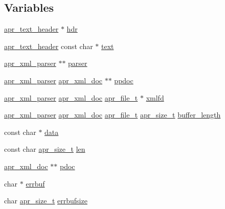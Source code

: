 \subsection*{Variables}
\begin{DoxyCompactItemize}
\item 
\hyperlink{structapr__text__header}{apr\+\_\+text\+\_\+header} $\ast$ \hyperlink{group__APR__Util__XML_gacbb04b51077cdb37e6a8cfa4c93acb07}{hdr}
\item 
\hyperlink{structapr__text__header}{apr\+\_\+text\+\_\+header} const char $\ast$ \hyperlink{group__APR__Util__XML_ga6f353ddc97cf6dc93417f58016afe82c}{text}
\item 
\hyperlink{structapr__xml__parser}{apr\+\_\+xml\+\_\+parser} $\ast$$\ast$ \hyperlink{group__APR__Util__XML_ga770a26ab91fad38f2253d5450d6e600e}{parser}
\item 
\hyperlink{structapr__xml__parser}{apr\+\_\+xml\+\_\+parser} \hyperlink{structapr__xml__doc}{apr\+\_\+xml\+\_\+doc} $\ast$$\ast$ \hyperlink{group__APR__Util__XML_ga66438ff2319899893737db49b7292842}{ppdoc}
\item 
\hyperlink{structapr__xml__parser}{apr\+\_\+xml\+\_\+parser} \hyperlink{structapr__xml__doc}{apr\+\_\+xml\+\_\+doc} \hyperlink{structapr__file__t}{apr\+\_\+file\+\_\+t} $\ast$ \hyperlink{group__APR__Util__XML_gaca3c8f1a059f6838f226f0c4879c0782}{xmlfd}
\item 
\hyperlink{structapr__xml__parser}{apr\+\_\+xml\+\_\+parser} \hyperlink{structapr__xml__doc}{apr\+\_\+xml\+\_\+doc} \hyperlink{structapr__file__t}{apr\+\_\+file\+\_\+t} \hyperlink{group__apr__platform_gaaa72b2253f6f3032cefea5712a27540e}{apr\+\_\+size\+\_\+t} \hyperlink{group__APR__Util__XML_gaebde593fb462b2b88e317e0ec5f0131e}{buffer\+\_\+length}
\item 
const char $\ast$ \hyperlink{group__APR__Util__XML_ga8f64897c7ccc5c13f276d1d07c4e7095}{data}
\item 
const char \hyperlink{group__apr__platform_gaaa72b2253f6f3032cefea5712a27540e}{apr\+\_\+size\+\_\+t} \hyperlink{group__APR__Util__XML_ga1e9401816e3a1cf930f448db46978ea7}{len}
\item 
\hyperlink{structapr__xml__doc}{apr\+\_\+xml\+\_\+doc} $\ast$$\ast$ \hyperlink{group__APR__Util__XML_gad270a53cb15625305f196ee848a7ef4e}{pdoc}
\item 
char $\ast$ \hyperlink{group__APR__Util__XML_ga844ffb41af9cf83add741994874afb59}{errbuf}
\item 
char \hyperlink{group__apr__platform_gaaa72b2253f6f3032cefea5712a27540e}{apr\+\_\+size\+\_\+t} \hyperlink{group__APR__Util__XML_gab934f5bfb716b96bcbbc8328eb4c91a0}{errbufsize}
$$
\end{DoxyCompactItemize}
